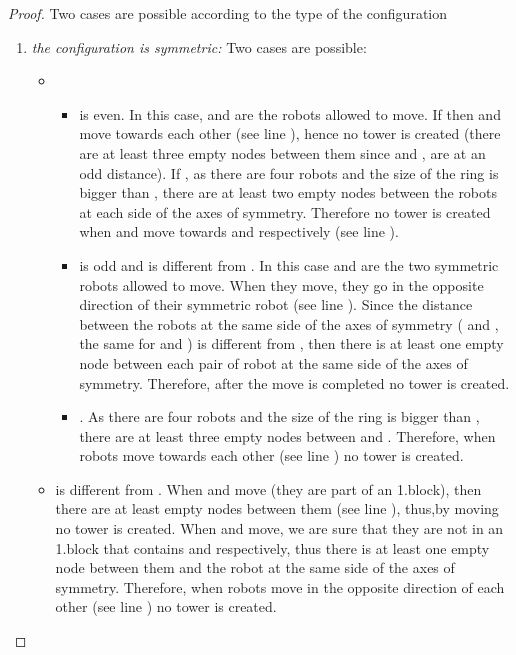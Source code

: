 \documentclass[12pt]{llncs}
\begin{document}
\begin{proof}
Two cases are possible according to the type of the configuration

\begin{enumerate}
\item{\textit{the configuration is symmetric:}}  Two cases are possible:
\begin{itemize}
\item {}
\begin{itemize}
\item{ is even}. In this case,  and  are the robots allowed to move. If  then  and  move towards each other (see line ), hence no tower is created (there are at least three empty nodes between them since  and ,  are at an odd distance). If , as there are four robots and the size of the ring is bigger than , there are at least two empty nodes between the robots at each side of the axes of symmetry. Therefore no tower is created when  and  move towards  and  respectively (see line ). 

\item{ is odd and is different from }. In this case  and  are the two symmetric robots allowed to move. When they move, they go in the opposite direction of their symmetric robot (see line ). Since the distance between the robots at the same side of the axes of symmetry ( and , the same for  and ) is different from , then there is at least one empty node between each pair of robot at the same side of the axes of symmetry. Therefore, after the move is completed no tower is created.

\item{}. As there are four robots and the size of the ring is bigger than , there are at least three empty nodes between  and . Therefore, when robots move towards each other (see line ) no tower is created.
\end{itemize}

\item { is different from }. When  and  move (they are part of an 1.block), then there are at least  empty nodes between them (see line ), thus,by moving no tower is created. When  and  move, we are sure that they are not in an 1.block that contains  and  respectively, thus there is at least one empty node between them and the robot at the same side of the axes of symmetry. Therefore,  when robots move in the opposite direction of each other (see line ) no tower is created.


\end{itemize}
\end{enumerate}
\end{proof}
\end{document}

